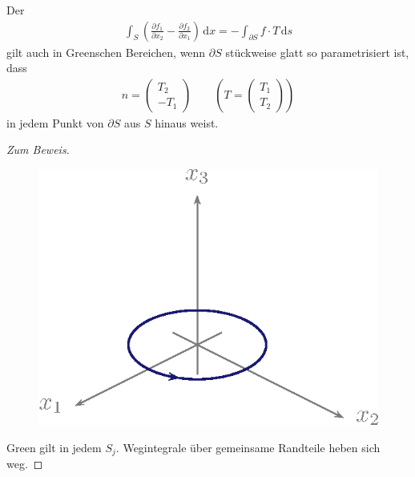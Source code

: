 \documentclass[a4paper,10pt]{scrbook}
\begin{document}
\begin{theorem}[Folgerung]
  Der 
  \begin{align*}
    \int_S \left( \frac{\partial f_1}{\partial x_2} - \frac{\partial f_2}{\partial x_1} \right) \, \mathrm{d}x = - \int_{\partial S} f \cdot T \, \mathrm{d}s
  \end{align*}
  gilt auch in Greenschen Bereichen, wenn $\partial S$ stückweise glatt so parametrisiert ist, dass
  \begin{align*}
    n = \begin{pmatrix} T_2 \\ - T_1 \end{pmatrix} \qquad \left( T = \begin{pmatrix} T_1 \\ T_2 \end{pmatrix} \right)
  \end{align*}
  in jedem Punkt von $\partial S$ aus $S$ hinaus weist.

  \begin{proof}[Zum Beweis]
    \begin{figure}[H]
      \centering
      \includegraphics[scale=0.2]{images/ana3-tmp-69}
    \end{figure}
    Green gilt in jedem $S_j$. Wegintegrale über gemeinsame Randteile heben sich weg.
  \end{proof}
\end{theorem}
\end{document}
